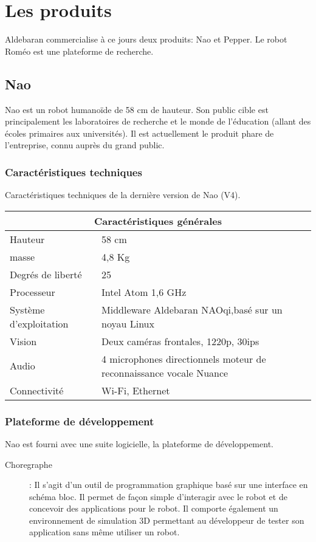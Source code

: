 \section{Les produits}
\label{Entreprise: Les produits}
Aldebaran commercialise à ce jours deux produits: Nao et Pepper. Le robot Roméo est une plateforme de recherche. 

\subsection{Nao}
\label{Entreprise: Les produits: Nao}
Nao est un robot humanoïde de 58 cm de hauteur. Son public cible est principalement les laboratoires de recherche et le monde de l'éducation (allant des écoles primaires aux universités). Il est actuellement le produit phare de l'entreprise, connu auprès du grand public. 

\subsubsection{Caractéristiques techniques}
\label{Entreprise:Les produits: Nao: Caractéristiques techniques}
Caractéristiques techniques de la dernière version de Nao (V4).
\newline 

\begin{tabular}{ | l | p{7cm} | }
\hline
\multicolumn{2}{|c|}{Caractéristiques générales} \\
\hline
Hauteur & 58 cm \\
\hline 
masse & 4,8 Kg \\
\hline 
Degrés de liberté  & 25 \\
\hline
Processeur & Intel Atom 1,6 GHz \\
\hline
Système d'exploitation & Middleware Aldebaran NAOqi,\newline basé sur un noyau Linux \\
\hline 
Vision & Deux caméras frontales, 1220p, 30ips \\
\hline
Audio & 4 microphones directionnels \newline moteur de reconnaissance vocale Nuance  \\
\hline
Connectivité & Wi-Fi, Ethernet \\
\hline
\end{tabular}

\subsubsection{Plateforme de développement}
\label{Entreprise:Les produits: Nao: Plateforme de développement}
Nao est fourni avec une suite logicielle, la plateforme de développement.
\begin{description}
	\item[Choregraphe]: Il s'agit d'un outil de programmation graphique basé sur une interface en schéma bloc. Il permet de façon simple d'interagir avec le robot et de concevoir des applications pour le robot. Il comporte également un environnement de simulation 3D permettant au développeur de tester son application sans même utiliser un robot.   
\end{description}


